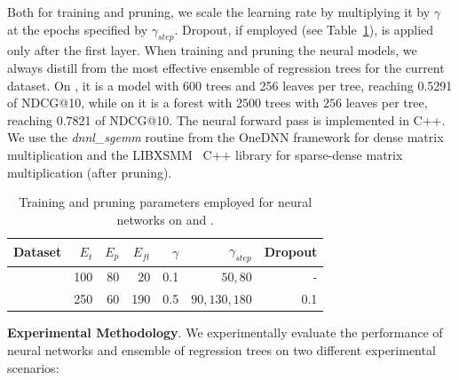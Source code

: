 Both for training and pruning, we scale the learning rate by multiplying it by $\gamma$ at the epochs specified by $\gamma_{step}$. Dropout, if employed (see Table~\ref{table:neuraltrainparams}), is applied only after the first layer.
When training and pruning the neural models, we always distill from the most effective ensemble of regression trees for the current dataset. On \msn, it is a model with 600 trees and 256 leaves per tree, reaching 0.5291 of NDCG@10, while on \istella it is a forest with $2500$ trees with $256$ leaves per tree, reaching 0.7821 of NDCG@10.	
 The neural forward pass is implemented in C++. We use the \textit{dnnl\_sgemm} routine from the OneDNN framework for dense matrix multiplication and the LIBXSMM~\cite{heinecke2016libxsmm} C++ library for sparse-dense matrix multiplication (after pruning).

\begin{table}[htb]
	\centering
	\begin{tabular}{lrrrrrr}
		\toprule
		Dataset & $E_t$ & $E_p$& $E_{ft}$& $\gamma$& $\gamma_{step}$ & Dropout \\
		\midrule
		\msn & 100 & 80 & 20 & 0.1 & $ 50, 80 $ & - \\
		\istella & 250 & 60 & 190 & 0.5 & $ 90, 130, 180 $ & 0.1 \\
		\bottomrule
	\end{tabular}%
	\caption{Training and pruning parameters employed for neural networks on \msn and \istella.\label{table:neuraltrainparams}}
\end{table}

\smallskip	

\noindent \textbf{Experimental Methodology}. We experimentally evaluate the performance of neural networks and ensemble of regression trees on two different experimental scenarios:

